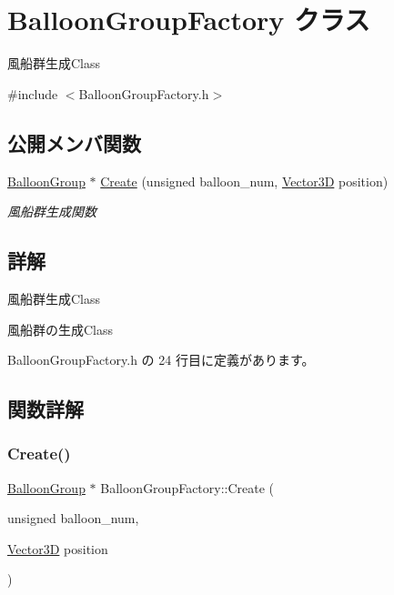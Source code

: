 \hypertarget{class_balloon_group_factory}{}\section{Balloon\+Group\+Factory クラス}
\label{class_balloon_group_factory}


風船群生成\+Class  




{\ttfamily \#include $<$Balloon\+Group\+Factory.\+h$>$}

\subsection*{公開メンバ関数}
\begin{DoxyCompactItemize}
\item 
\mbox{\hyperlink{class_balloon_group}{Balloon\+Group}} $\ast$ \mbox{\hyperlink{class_balloon_group_factory_ab443f55e352706f3247ef3eb47c3ff2a}{Create}} (unsigned balloon\+\_\+num, \mbox{\hyperlink{class_vector3_d}{Vector3D}} position)
\begin{DoxyCompactList}\small\item\em 風船群生成関数 \end{DoxyCompactList}\end{DoxyCompactItemize}


\subsection{詳解}
風船群生成\+Class 

風船群の生成\+Class 

 Balloon\+Group\+Factory.\+h の 24 行目に定義があります。



\subsection{関数詳解}
\mbox{\label{class_balloon_group_factory_ab443f55e352706f3247ef3eb47c3ff2a}} 
\subsubsection{\texorpdfstring{Create()}{Create()}}
{\footnotesize\ttfamily \mbox{\hyperlink{class_balloon_group}{Balloon\+Group}} $\ast$ Balloon\+Group\+Factory\+::\+Create (\begin{DoxyParamCaption}\item[{unsigned}]{balloon\+\_\+num,  }\item[{\mbox{\hyperlink{class_vector3_d}{Vector3D}}}]{position }\end{DoxyParamCaption})}



